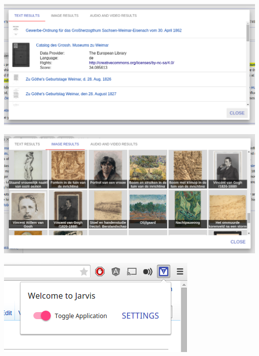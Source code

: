  \begin{minipage}{\linewidth}
	\centering
	\includegraphics[width=\linewidth]{Bilder/app-screenshots/text-results-hovered.png}
	\label{fig:textResultsHover}
 \end{minipage}
 \begin{minipage}{\linewidth}
	\centering
	\includegraphics[width=\linewidth]{Bilder/app-screenshots/image-results.png}
	\label{fig:imageResults}
 \end{minipage}
 \begin{minipage}{\linewidth}
	\centering
	\includegraphics[scale=0.6]{Bilder/app-screenshots/popup.png}
	\label{fig:popup}
 \end{minipage}
